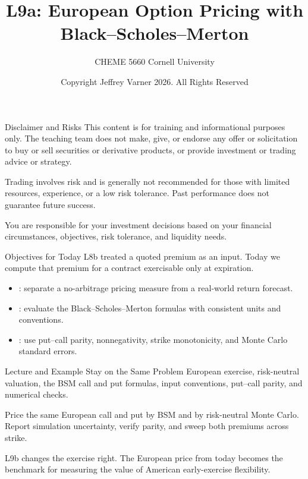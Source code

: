 \documentclass[aspectratio=169,11pt]{beamer}
\title{\texorpdfstring{{\vnheavy L9a}}{L9a}: European Option Pricing with Black--Scholes--Merton}
\subtitle{CHEME 5660 Cornell University}
\author{Copyright Jeffrey Varner 2026. All Rights Reserved}
\begin{document}
\vntitlepage

\begin{frame}{Disclaimer and Risks}
  \vspace{0.6em}
  \textbf{} This content is for training and informational
  purposes only. The teaching team does not make, give, or endorse any offer or
  solicitation to buy or sell securities or derivative products, or provide
  investment or trading advice or strategy.

  \vspace{1.1em}
  \textbf{} Trading involves risk and is generally not recommended for
  those with limited resources, experience, or a low risk tolerance. Past
  performance does not guarantee future success.

  \vspace{1.1em}
  \textbf{} You are responsible for your investment decisions
  based on your financial circumstances, objectives, risk tolerance, and
  liquidity needs.
\end{frame}

\begin{frame}{Objectives for Today}
  L8b treated a quoted premium as an input. Today we compute that premium for a
  contract exercisable only at expiration.

  \vspace{0.5em}
  {\large\textbf{}}
  \begin{itemize}\setlength{\itemsep}{0.4em}
    \item {}: separate a no-arbitrage
      pricing measure from a real-world return forecast.
    \item {}: evaluate the
      Black--Scholes--Merton formulas with consistent units and conventions.
    \item {}: use put--call parity, nonnegativity,
      strike monotonicity, and Monte Carlo standard errors.
  \end{itemize}
\end{frame}

\begin{frame}{Lecture and Example Stay on the Same Problem}
  \textbf{} European exercise, risk-neutral valuation, the BSM call
  and put formulas, input conventions, put--call parity, and numerical checks.

  \vspace{1.0em}
  \textbf{} Price the same European call and put by BSM and by
  risk-neutral Monte Carlo. Report simulation uncertainty, verify parity, and
  sweep both premiums across strike.

  \vspace{1.0em}
  \textbf{} L9b changes the exercise right. The European price from
  today becomes the benchmark for measuring the value of American early-exercise
  flexibility.
\end{frame}
\end{document}
